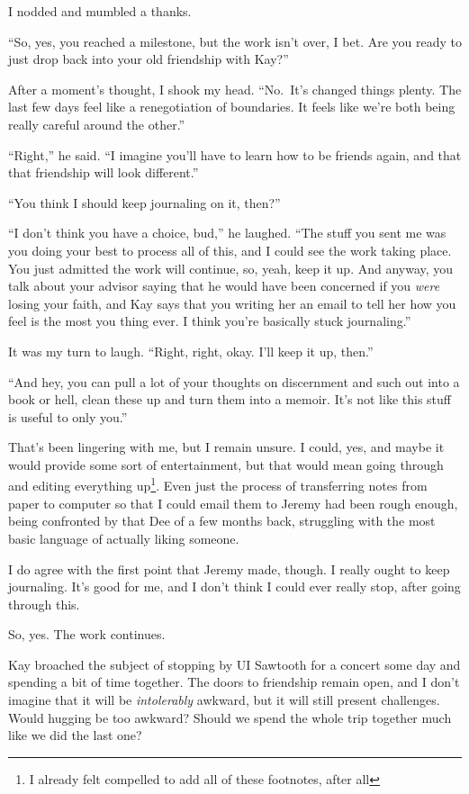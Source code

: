 I nodded and mumbled a thanks.

``So, yes, you reached a milestone, but the work isn't over, I bet. Are you ready to just drop back into your old friendship with Kay?''

After a moment's thought, I shook my head. ``No.~It's changed things plenty. The last few days feel like a renegotiation of boundaries. It feels like we're both being really careful around the other.''

``Right,'' he said. ``I imagine you'll have to learn how to be friends again, and that that friendship will look different.''

``You think I should keep journaling on it, then?''

``I don't think you have a choice, bud,'' he laughed. ``The stuff you sent me was you doing your best to process all of this, and I could see the work taking place. You just admitted the work will continue, so, yeah, keep it up. And anyway, you talk about your advisor saying that he would have been concerned if you \emph{were} losing your faith, and Kay says that you writing her an email to tell her how you feel is the most you thing ever. I think you're basically stuck journaling.''

It was my turn to laugh. ``Right, right, okay. I'll keep it up, then.''

``And hey, you can pull a lot of your thoughts on discernment and such out into a book or hell, clean these up and turn them into a memoir. It's not like this stuff is useful to only you.''

That's been lingering with me, but I remain unsure. I could, yes, and maybe it would provide some sort of entertainment, but that would mean going through and editing everything up\footnote{I already felt compelled to add all of these footnotes, after all}. Even just the process of transferring notes from paper to computer so that I could email them to Jeremy had been rough enough, being confronted by that Dee of a few months back, struggling with the most basic language of actually liking someone.

I do agree with the first point that Jeremy made, though. I really ought to keep journaling. It's good for me, and I don't think I could ever really stop, after going through this.

So, yes. The work continues.

Kay broached the subject of stopping by UI Sawtooth for a concert some day and spending a bit of time together. The doors to friendship remain open, and I don't imagine that it will be \emph{intolerably} awkward, but it will still present challenges. Would hugging be too awkward? Should we spend the whole trip together much like we did the last one?

